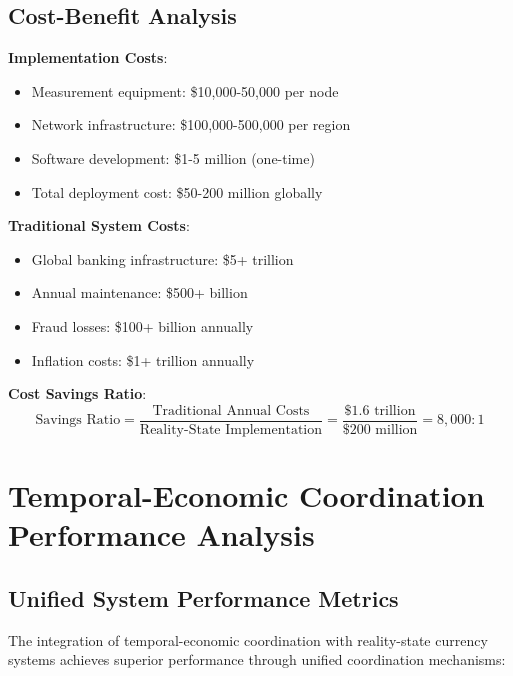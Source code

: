 \documentclass[12pt,a4paper]{article}
\begin{document}
\subsection{Cost-Benefit Analysis}

\textbf{Implementation Costs}:
\begin{itemize}
\item Measurement equipment: \$10,000-50,000 per node
\item Network infrastructure: \$100,000-500,000 per region
\item Software development: \$1-5 million (one-time)
\item Total deployment cost: \$50-200 million globally
\end{itemize}

\textbf{Traditional System Costs}:
\begin{itemize}
\item Global banking infrastructure: \$5+ trillion
\item Annual maintenance: \$500+ billion
\item Fraud losses: \$100+ billion annually
\item Inflation costs: \$1+ trillion annually
\end{itemize}

\textbf{Cost Savings Ratio}:
\begin{equation}
\text{Savings Ratio} = \frac{\text{Traditional Annual Costs}}{\text{Reality-State Implementation}} = \frac{\$1.6 \text{ trillion}}{\$200 \text{ million}} = 8,000:1
\end{equation}

\section{Temporal-Economic Coordination Performance Analysis}

\subsection{Unified System Performance Metrics}

The integration of temporal-economic coordination with reality-state currency systems achieves superior performance through unified coordination mechanisms:
\end{document}
